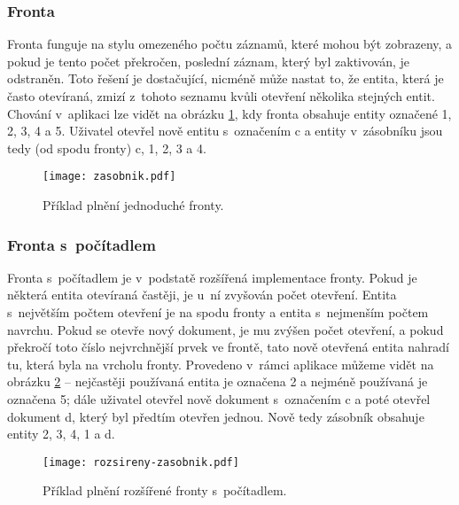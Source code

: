 \subsubsection{Fronta}
\par Fronta funguje na stylu omezeného počtu záznamů, které mohou být zobrazeny, a pokud je tento počet překročen, poslední záznam, který byl zaktivován, je odstraněn. Toto řešení je dostačující, nicméně může nastat to, že entita, která je často otevíraná, zmizí z~tohoto seznamu kvůli otevření několika stejných entit. Chování v~aplikaci lze vidět na obrázku \ref{zasobnik}, kdy fronta obsahuje entity označené 1, 2, 3, 4 a 5. Uživatel otevřel nově entitu s~označením c a entity v~zásobníku jsou tedy (od spodu fronty) c, 1, 2, 3 a 4.
\begin{figure}[htp]
\centering
\texttt{[image: zasobnik.pdf]}
\caption{Příklad plnění jednoduché fronty.}
\label{zasobnik}
\end{figure}
\newpage
\subsubsection{Fronta s~počítadlem}
\par Fronta s~počítadlem je v~podstatě rozšířená implementace fronty. Pokud je některá entita otevíraná častěji, je u~ní zvyšován počet otevření. Entita s~největším počtem otevření je na spodu fronty a entita s~nejmenším počtem navrchu. Pokud se otevře nový dokument, je mu zvýšen počet otevření, a pokud překročí toto číslo nejvrchnější prvek ve frontě, tato nově otevřená entita nahradí tu, která byla na vrcholu fronty. Provedeno v~rámci aplikace můžeme vidět na obrázku \ref{counter} -- nejčastěji používaná entita je označena 2 a nejméně používaná je označena 5; dále uživatel otevřel nově dokument s~označením c a poté otevřel dokument d, který byl předtím otevřen jednou. Nově tedy zásobník obsahuje entity 2, 3, 4, 1 a d.
\begin{figure}[htp]
\centering
\texttt{[image: rozsireny-zasobnik.pdf]}
\caption{Příklad plnění rozšířené fronty s~počítadlem.}
\label{counter}
\end{figure}
\newpage
